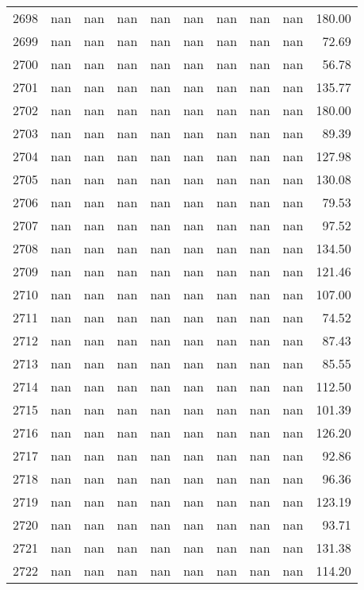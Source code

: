 \begin{tabular}{lrrrrrrrrr}
2698 & nan & nan & nan & nan & nan & nan & nan & nan & 180.00 \\
2699 & nan & nan & nan & nan & nan & nan & nan & nan & 72.69 \\
2700 & nan & nan & nan & nan & nan & nan & nan & nan & 56.78 \\
2701 & nan & nan & nan & nan & nan & nan & nan & nan & 135.77 \\
2702 & nan & nan & nan & nan & nan & nan & nan & nan & 180.00 \\
2703 & nan & nan & nan & nan & nan & nan & nan & nan & 89.39 \\
2704 & nan & nan & nan & nan & nan & nan & nan & nan & 127.98 \\
2705 & nan & nan & nan & nan & nan & nan & nan & nan & 130.08 \\
2706 & nan & nan & nan & nan & nan & nan & nan & nan & 79.53 \\
2707 & nan & nan & nan & nan & nan & nan & nan & nan & 97.52 \\
2708 & nan & nan & nan & nan & nan & nan & nan & nan & 134.50 \\
2709 & nan & nan & nan & nan & nan & nan & nan & nan & 121.46 \\
2710 & nan & nan & nan & nan & nan & nan & nan & nan & 107.00 \\
2711 & nan & nan & nan & nan & nan & nan & nan & nan & 74.52 \\
2712 & nan & nan & nan & nan & nan & nan & nan & nan & 87.43 \\
2713 & nan & nan & nan & nan & nan & nan & nan & nan & 85.55 \\
2714 & nan & nan & nan & nan & nan & nan & nan & nan & 112.50 \\
2715 & nan & nan & nan & nan & nan & nan & nan & nan & 101.39 \\
2716 & nan & nan & nan & nan & nan & nan & nan & nan & 126.20 \\
2717 & nan & nan & nan & nan & nan & nan & nan & nan & 92.86 \\
2718 & nan & nan & nan & nan & nan & nan & nan & nan & 96.36 \\
2719 & nan & nan & nan & nan & nan & nan & nan & nan & 123.19 \\
2720 & nan & nan & nan & nan & nan & nan & nan & nan & 93.71 \\
2721 & nan & nan & nan & nan & nan & nan & nan & nan & 131.38 \\
2722 & nan & nan & nan & nan & nan & nan & nan & nan & 114.20 \\

\end{tabular}
